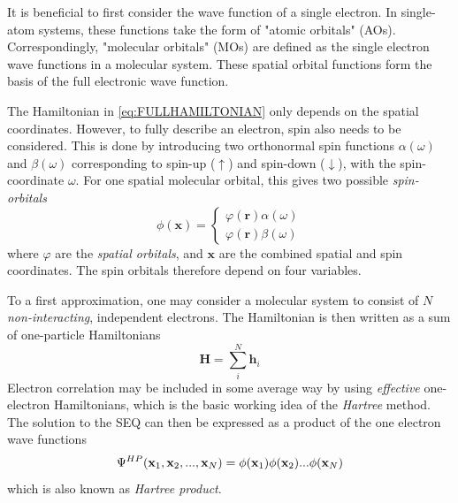 It is beneficial to first consider the wave function of a single electron. In single-atom systems, these functions take the form of "atomic orbitals" (AOs). Correspondingly, "molecular orbitals" (MOs) are defined as the single electron wave functions in a molecular system. These spatial orbital functions form the basis of the full electronic wave function.  

The Hamiltonian in \ref{eq:FULLHAMILTONIAN} only depends on the spatial coordinates. However, to fully describe an electron, spin also needs to be considered. This is done by introducing two orthonormal spin functions $\alpha(\omega)$ and $\beta(\omega)$ corresponding to spin-up ($\uparrow$) and spin-down ($\downarrow$), with the spin-coordinate $\omega$. For one spatial molecular orbital, this gives two possible \emph{spin-orbitals}
\begin{equation}
\phi(\mathbf{x}) = \left\lbrace\begin{matrix}
\varphi(\mathbf{r}) \alpha(\omega) \\
\varphi(\mathbf{r}) \beta(\omega)
\end{matrix} \right.
\end{equation}
\noindent where $\varphi$ are the \emph{spatial orbitals}, and $\mathbf{x}$ are the combined spatial and spin coordinates. The spin orbitals therefore depend on four variables.

To a first approximation, one may consider a molecular system to consist of $N$ \emph{non-interacting}, independent electrons. The Hamiltonian is then written as a sum of one-particle Hamiltonians 
\begin{equation}
\mathbf{H} = \sum_i^N \mathbf{h}_i 
\end{equation}
\noindent Electron correlation may be included in some average way by using \emph{effective} one-electron Hamiltonians, which is the basic working idea of the \emph{Hartree} method. The solution to the SEQ can then be expressed as a product of the one electron wave functions
\begin{equation}
\Psi^{HP}(\mathbf{x}_1,\mathbf{x}_2,...,\mathbf{x}_N) = \phi(\mathbf{x}_1) \phi(\mathbf{x}_2) ... \phi(\mathbf{x}_N)
\end{equation}
\noindent which is also known as \emph{Hartree product}. 

